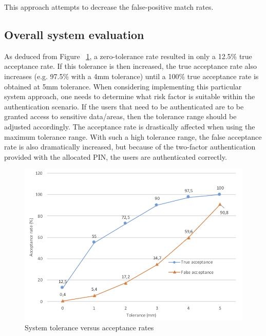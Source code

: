 This approach attempts to decrease the false-positive match rates. 


\subsection{Overall system evaluation}

As deduced from Figure ~\ref{fig:System tolerance versus acceptance rates}, a zero-tolerance rate resulted in only a 12.5\% true acceptance rate. If this tolerance is then increased, the true acceptance rate also increases (e.g. 97.5\% with a 4mm tolerance) until a 100\% true acceptance rate is obtained at 5mm tolerance. 
When considering implementing this particular system approach, one needs to determine what risk factor is suitable within the authentication scenario. If the users that need to be authenticated are to be granted access to sensitive data/areas, then the tolerance range should be adjusted accordingly. The acceptance rate is drastically affected when using the maximum tolerance range. With such a high tolerance range, the false acceptance rate is also dramatically increased, but because of the two-factor authentication provided with the allocated PIN, the users are authenticated correctly.

    
    \begin{figure}[htbp!] 
    \centering    
    \includegraphics[width=1.0\textwidth]{Chapter4/Figs/Tolerance.png}
    \caption[System tolerance versus acceptance rates]{System tolerance versus acceptance rates}
    \label{fig:System tolerance versus acceptance rates}
    \end{figure}


